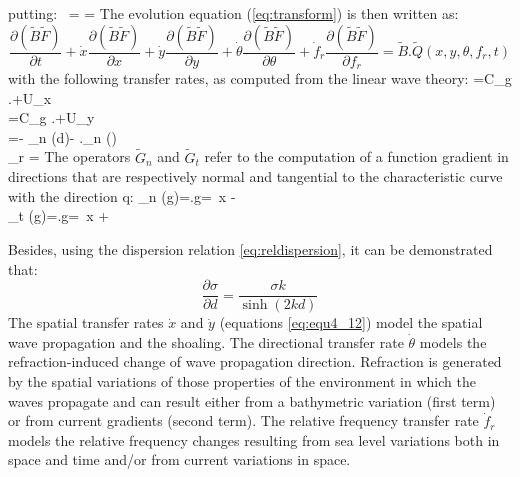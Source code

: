 \bequ
\label{eq:GrindEQ__4_10}
\mbox{putting: } =
=
\eequ
The evolution equation (\ref{eq:transform}) is then written as:
\begin{equation} \label{GrindEQ__4_11_}
  \frac{\partial (\tilde{B}\tilde{F})}{\partial t} +\dot{x}\frac{\partial
    (\tilde{B}\tilde{F})}{\partial x} +\dot{y}\frac{\partial (\tilde{B}
    \tilde{F})}{\partial y} +\dot{\theta }\frac{\partial (\tilde{B}
    \tilde{F})}{\partial \theta } +\dot{f}_{r} \frac{\partial (\tilde{B}
    \tilde{F})}{\partial f_{r} } =\tilde{B}.\tilde{Q}(x,y,\theta ,f_{r} ,t)
\end{equation}
with the following transfer rates, as computed from the linear wave theory:
\bequ
\label{eq:equ4_12}
\dsp {}=C_g .\sin \theta +U_x \\[6pt]
\dsp {}=C_g .\cos \theta +U_y\\[6pt] 
\dsp \dot{\theta }=- 
_n (d)- ._n ()\\[6pt]
\dsp {}_{r} = 
\earr
\eequ
The operators $\tilde{G}_n $ and $\tilde{G}_t $ refer to the computation of a
function gradient in directions that are respectively normal and tangential to
the characteristic curve with the direction q:
\bequ
\label{eq:equ4_13}
\dsp {}_{n} (g)=.\vec{\nabla }g=\cos \theta \, 
     {\partial x} \; -\sin \theta \,  \\[6pt]
\dsp {}_{t} (g)=.\vec{\nabla }g=\sin \theta \, 
          {\partial x} \; +\cos \theta \, 
\earr
\eequ

 Besides, using the dispersion relation \ref{eq:reldispersion}, it can be demonstrated that:
\begin{equation} \label{GrindEQ__4_14_}
\frac{\partial \sigma }{\partial d} =\frac{\sigma k}{\sinh (2kd)}
\end{equation}
The spatial transfer rates $\dot{x}$ and $\dot{y}$ (equations \ref{eq:equ4_12})
model the spatial wave propagation and the shoaling. The directional transfer
rate $\dot{\theta }$ models the refraction-induced change of wave propagation
direction. Refraction is generated by the spatial variations of those
properties of the environment in which the waves propagate and can result
either from a bathymetric variation (first term) or from current gradients
(second term). The relative frequency transfer rate $\dot{f}_r $ models the
relative frequency changes resulting from sea level variations both in space
and time and/or from current variations in space.

